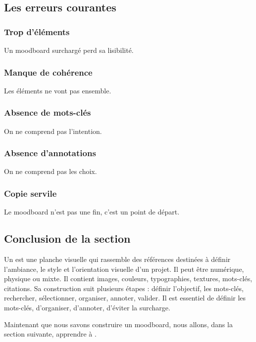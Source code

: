 \subsection{Les erreurs courantes}

\subsubsection{Trop d'éléments}

Un moodboard surchargé perd sa lisibilité.

\subsubsection{Manque de cohérence}

Les éléments ne vont pas ensemble.

\subsubsection{Absence de mots-clés}

On ne comprend pas l'intention.

\subsubsection{Absence d'annotations}

On ne comprend pas les choix.

\subsubsection{Copie servile}

Le moodboard n'est pas une fin, c'est un point de départ.

\subsection*{Conclusion de la section}

Un  est une planche visuelle qui rassemble des références destinées à définir l'ambiance, le style et l'orientation visuelle d'un projet. Il peut être numérique, physique ou mixte. Il contient images, couleurs, typographies, textures, mots-clés, citations. Sa construction suit plusieurs étapes : définir l'objectif, les mots-clés, rechercher, sélectionner, organiser, annoter, valider. Il est essentiel de définir les mots-clés, d'organiser, d'annoter, d'éviter la surcharge.

Maintenant que nous savons construire un moodboard, nous allons, dans la section suivante, apprendre à .


